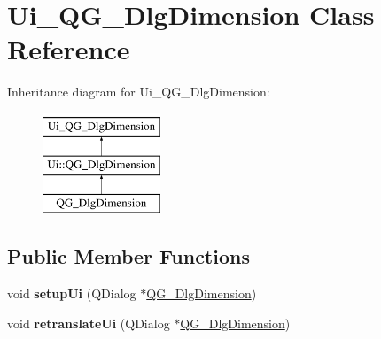 \hypertarget{classUi__QG__DlgDimension}{\section{Ui\-\_\-\-Q\-G\-\_\-\-Dlg\-Dimension Class Reference}
\label{classUi__QG__DlgDimension}
}
Inheritance diagram for Ui\-\_\-\-Q\-G\-\_\-\-Dlg\-Dimension\-:\begin{figure}[H]
\begin{center}
\leavevmode
\includegraphics[height=3.000000cm]{classUi__QG__DlgDimension}
\end{center}
\end{figure}
\subsection*{Public Member Functions}
\begin{DoxyCompactItemize}
\item 
\hypertarget{classUi__QG__DlgDimension_af72ad68383d5f913dbdd169f59fda0b7}{void {\bfseries setup\-Ui} (Q\-Dialog $\ast$\hyperlink{classQG__DlgDimension}{Q\-G\-\_\-\-Dlg\-Dimension})}\label{classUi__QG__DlgDimension_af72ad68383d5f913dbdd169f59fda0b7}

\item 
\hypertarget{classUi__QG__DlgDimension_a86422d8c8b0e14177b9f2c159b938625}{void {\bfseries retranslate\-Ui} (Q\-Dialog $\ast$\hyperlink{classQG__DlgDimension}{Q\-G\-\_\-\-Dlg\-Dimension})}\label{classUi__QG__DlgDimension_a86422d8c8b0e14177b9f2c159b938625}

\end{DoxyCompactItemize}
